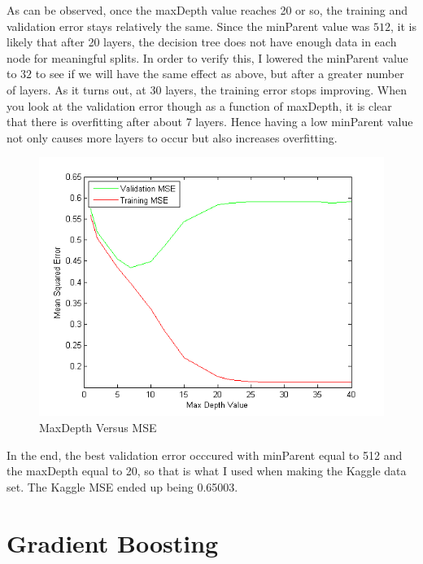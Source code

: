\documentclass[twoside,11pt]{article}
\theoremstyle{definition}
\begin{document}
As can be observed, once the maxDepth value reaches 20 or so, the training and validation error stays relatively the same. Since the minParent value was $512$, it is likely that after 20 layers, the decision tree does not have enough data in each node for meaningful splits. In order to verify this, I lowered the minParent value to $32$ to see if we will have the same effect as above, but after a greater number of layers. As it turns out, at 30 layers, the training error stops improving. When you look at the validation error though as a function of maxDepth, it is clear that there is overfitting after about 7 layers. Hence having a low minParent value not only causes more layers to occur but also increases overfitting.  \\
\begin{figure}[h]
\centering
\includegraphics[width=4 in]{maxDepthVersusMSE2.png}
\caption{MaxDepth Versus MSE}
\end{figure}

In the end, the best validation error occcured with minParent equal to 512 and the maxDepth equal to 20, so that is what I used when making the Kaggle data set. The Kaggle MSE ended up being 0.65003. 

\newpage

\section*{Gradient Boosting}
\end{document}
